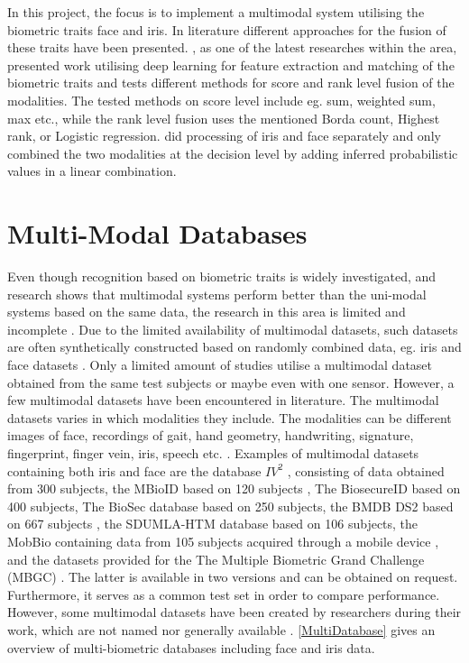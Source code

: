 In this project, the focus is to implement a multimodal system utilising the biometric traits face and iris. In literature different approaches for the fusion of these traits have been presented. \cite{Al-Waisy2017a}, as one of the latest researches within the area, presented work utilising deep learning for feature extraction and matching of the biometric traits and tests different methods for score and rank level fusion of the modalities. The tested methods on score level include eg.  sum, weighted sum, max etc., while the rank level fusion uses the mentioned Borda count, Highest rank, or Logistic regression. \cite{Chen2005a} did processing of iris and face separately and only combined the two modalities at the decision level by adding inferred probabilistic values in a linear combination.   

\section{Multi-Modal Databases}
\label{sec:multi_modal_data}
Even though recognition based on biometric traits is widely investigated, and research shows that multimodal systems perform better than the uni-modal systems based on the same data, the research in this area is limited and incomplete \citep{Chen2005a,Bowyer2016b}. Due to the limited availability of multimodal datasets, such datasets are often synthetically constructed based on randomly combined data, eg. iris and face datasets \citep{Chen2005a}. Only a limited amount of studies  utilise a multimodal dataset obtained from the same test subjects or maybe even with one sensor. However, a few multimodal datasets have been encountered in literature. The multimodal datasets varies in which modalities they include. The modalities can be different images of face, recordings of gait, hand geometry, handwriting, signature, fingerprint, finger vein, iris, speech etc. \citep{Yin2011, Dessimoz2007, Ross2003, Ortega-Garcia2010}. Examples of multimodal datasets containing both iris and face are the database $IV^2$ \citep{Petrovska-Delacretaz2008a}, consisting of data obtained from 300 subjects, the MBioID based on 120 subjects \citep{Dessimoz2007}, The BiosecureID based on 400 subjects, The BioSec database based on 250 subjects, the BMDB DS2 based on 667 subjects \citep{Ortega-Garcia2010}, the SDUMLA-HTM database based on 106 subjects, the MobBio containing data from 105 subjects acquired through a mobile device \citep{Sequeira2014}, and the datasets provided for the The Multiple Biometric Grand Challenge (MBGC) \citep{Bowyer2016b}. The latter is available in two versions and can be obtained on request. Furthermore, it serves as a common test set in order to compare performance. However, some multimodal datasets have been created by researchers during their work, which are not named nor generally available \citep{Bowyer2016b}. \autoref{MultiDatabase} gives an overview of multi-biometric databases including face and iris data. 

